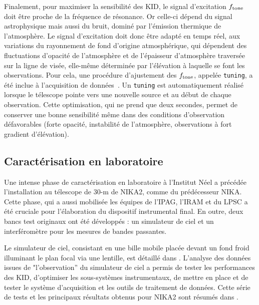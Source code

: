 Finalement, pour maximiser la sensibilité des KID, le signal d'excitation
$f_{\rm{tone}}$ doit être proche de la fréquence de résonance. Or
celle-ci dépend du signal astrophysique mais aussi du bruit, dominé
par l'émission thermique de l'atmosphère. Le signal d'excitation doit
donc être adapté en temps réel, aux variations du rayonnement de fond 
d'origine atmosphérique, qui dépendent des fluctuations d'opacité de
l'atmosphère et de l'épaisseur d'atmosphère traversée sur la ligne de
visée, elle-même déterminée par l'élévation à laquelle se font les
observations. Pour cela, une procédure d'ajustement des
$f_{\rm{tone}}$, appelée {\tt tuning}, a été inclue à l'acquisition
de données~\citep{Adam2018}. Un {\tt tuning} est automatiquement
réalisé lorsque le télescope pointe vers une nouvelle source et au
début de chaque observation. Cette optimisation, qui ne prend que deux
secondes, permet de conserver une bonne sensibilité même dans des
conditions d'observation défavorables (forte opacité, instabilité de
l'atmosphère, observations à fort gradient d'élévation).



\subsection{Caractérisation en laboratoire}
\label{se:bandpass}

Une intense phase de caractérisation en laboratoire à l'Institut Néel
a précédée l'installation au télescope de 30-m de NIKA2, comme du
prédécesseur NIKA. Cette phase, qui a aussi mobilisée les équipes de
l'IPAG, l'IRAM et du LPSC a été cruciale pour l'élaboration du
dispositif instrumental final. En outre, deux bancs test originaux ont
été développés : un simulateur de ciel et un interféromètre
pour les mesures de bandes passantes.

Le simulateur de ciel, consistant en une bille mobile placée devant un
fond froid illuminant le plan focal via une lentille, est détaillé dans
\citet{Catalano2014, Monfardini2011_NIKA}. L'analyse des données issues de
"l'observation'' du simulateur de ciel a permis de tester les
performances des KID, d'optimiser les sous-systèmes instrumentaux, de
mettre en place et de tester le système d'acquisition et les outils de
traitement de données. Cette série de tests et les principaux
résultats obtenus pour NIKA2 sont résumés dans \citet{Adam2018}.


